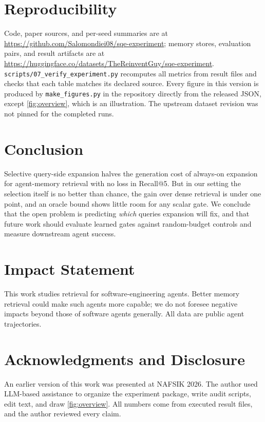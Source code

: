 \documentclass{article}
\begin{document}
\section{Reproducibility}
\label{sec:repro}

Code, paper sources, and per-seed summaries are at
\url{https://github.com/Salomondiei08/sqe-experiment}; memory stores,
evaluation pairs, and result artifacts are at
\url{https://huggingface.co/datasets/TheReinventGuy/sqe-experiment}.
\texttt{scripts/07\_verify\_experiment.py} recomputes all metrics from result
files and checks that each table matches its declared source. Every figure in
this version is produced by \texttt{make\_figures.py} in the repository directly from
the released JSON, except \cref{fig:overview}, which is an illustration.
The upstream dataset revision was not pinned for the completed runs.

\section{Conclusion}
\label{sec:conclusion}

Selective query-side expansion halves the generation cost of always-on
expansion for agent-memory retrieval with no loss in Recall@5. But in our
setting the selection itself is no better than chance, the gain over dense
retrieval is under one point, and an oracle bound shows little room for any
scalar gate. We conclude that the open problem is predicting \emph{which}
queries expansion will fix, and that future work should evaluate learned gates
against random-budget controls and measure downstream agent success.

\section*{Impact Statement}
This work studies retrieval for software-engineering agents. Better memory
retrieval could make such agents more capable; we do not foresee negative
impacts beyond those of software agents generally. All data are public agent
trajectories.

\section*{Acknowledgments and Disclosure}
An earlier version of this work was presented at NAFSIK 2026. The author used
LLM-based assistance to organize the experiment package, write audit scripts,
edit text, and draw \cref{fig:overview}. All numbers come from executed result
files, and the author reviewed every claim.
\end{document}
